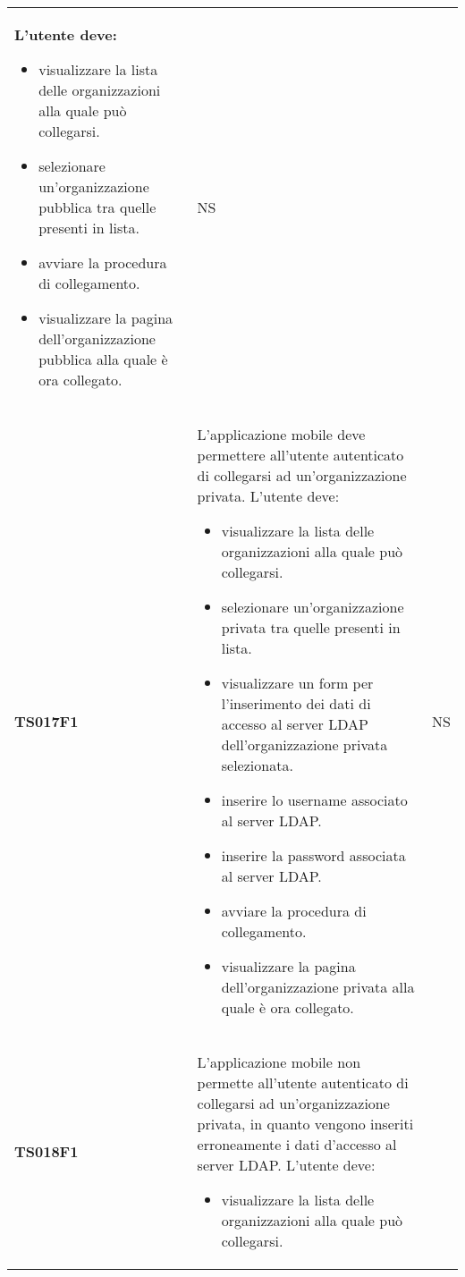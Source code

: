 \documentclass[../piano-di-qualifica.tex]{subfiles}
\begin{document}
\begin{centering}
\begin{longtable}[H]{>{\centering\bfseries}m{3cm} >{}p{10cm} >{\centering\arraybackslash}m{3cm}}
                      L'utente deve:
                      \begin{itemize}
                        \item visualizzare la lista delle organizzazioni alla quale può collegarsi.
                        \item selezionare un'organizzazione pubblica tra quelle presenti in lista.
                        \item avviare la procedura di collegamento.
                        \item visualizzare la pagina dell'organizzazione pubblica alla quale è ora collegato.
                      \end{itemize}
                    & NS \\
        TS017F1     & L'applicazione mobile deve permettere all'utente autenticato di collegarsi ad un'organizzazione privata. \newline
                      L'utente deve:
                      \begin{itemize}
                        \item visualizzare la lista delle organizzazioni alla quale può collegarsi.
                        \item selezionare un'organizzazione privata tra quelle presenti in lista.
                        \item visualizzare un form per l'inserimento dei dati di accesso al server LDAP dell'organizzazione privata selezionata.
                        \item inserire lo username associato al server LDAP\@.
                        \item inserire la password associata al server LDAP\@.
                        \item avviare la procedura di collegamento.
                        \item visualizzare la pagina dell'organizzazione privata alla quale è ora collegato.
                      \end{itemize}
                    & NS \\
        TS018F1     & L'applicazione mobile non permette all'utente autenticato di collegarsi ad un'organizzazione privata, in quanto vengono inseriti erroneamente i dati d'accesso al server LDAP\@. \newline
                      L'utente deve:
                      \begin{itemize}
                        \item visualizzare la lista delle organizzazioni alla quale può collegarsi.

\end{itemize}
\end{longtable}
\end{centering}
\end{document}
